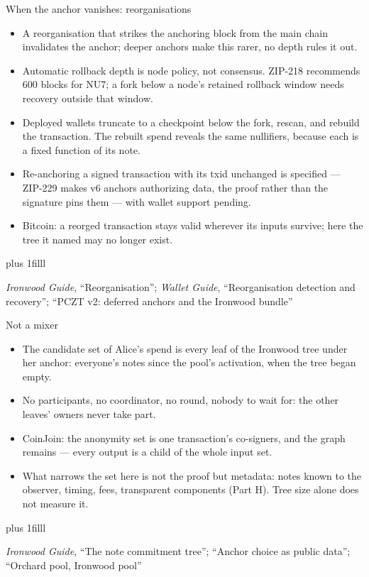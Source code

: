 \documentclass[aspectratio=169,11pt]{beamer}
\newcommand{\src}[1]{\par\vskip0pt plus 1filll
  {\fontsize{6}{7.2}\selectfont\color{arbdim}\raggedright #1\par}}
\begin{document}
\begin{frame}{When the anchor vanishes: reorganisations}
\begin{itemize}
  \item A reorganisation that strikes the anchoring block from the
    main chain invalidates the anchor; deeper anchors make this rarer,
    no depth rules it out.
  \item Automatic rollback depth is node policy, not consensus.
    ZIP-218 recommends $600$ blocks for NU7; a fork below a node's
    retained rollback window needs recovery outside that window.
  \item Deployed wallets truncate to a checkpoint below the fork,
    rescan, and rebuild the transaction. The rebuilt spend reveals the
    same nullifiers, because each is a fixed function of its note.
  \item Re-anchoring a signed transaction with its txid unchanged is
    specified --- ZIP-229 makes v6 anchors authorizing data, the proof
    rather than the signature pins them --- with wallet support
    pending.
  \item Bitcoin: a reorged transaction stays valid wherever its inputs
    survive; here the tree it named may no longer exist.
\end{itemize}
\src{\emph{Ironwood Guide}, ``Reorganisation''; \emph{Wallet Guide},
  ``Reorganisation detection and recovery''; ``PCZT v2: deferred anchors and the
  Ironwood bundle''}
\end{frame}

\begin{frame}{Not a mixer}
\begin{itemize}
  \item The candidate set of Alice's spend is every leaf of the
    Ironwood tree under her anchor: everyone's notes since the pool's
    activation, when the tree began empty.
  \item No participants, no coordinator, no round, nobody to wait
    for: the other leaves' owners never take part.
  \item CoinJoin: the anonymity set is one transaction's co-signers,
    and the graph remains --- every output is a child of the whole
    input set.
  \item What narrows the set here is not the proof but metadata:
    notes known to the observer, timing, fees, transparent
    components (Part H). Tree size alone does not measure it.
\end{itemize}
\src{\emph{Ironwood Guide}, ``The note commitment tree''; ``Anchor choice as
  public data''; ``Orchard pool, Ironwood pool''}
\end{frame}
\end{document}
